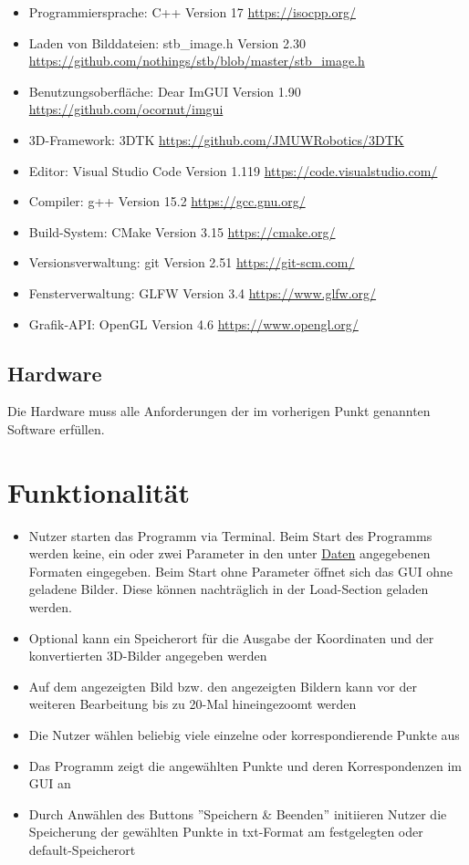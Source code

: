 \documentclass[a4paper,10pt]{scrartcl}
\begin{document}
\begin{itemize} 
\item Programmiersprache: C++ Version 17 \url{https://isocpp.org/} 
\item Laden von Bilddateien: stb\_image.h Version 2.30 \url{https://github.com/nothings/stb/blob/master/stb_image.h} 
\item Benutzungsoberfläche: Dear ImGUI Version 1.90 \url{https://github.com/ocornut/imgui} 
\item 3D-Framework: 3DTK \url{https://github.com/JMUWRobotics/3DTK} 
\item Editor: Visual Studio Code Version 1.119 \url{https://code.visualstudio.com/} 
\item Compiler: g++ Version 15.2 \url{https://gcc.gnu.org/} 
\item Build-System: CMake Version 3.15 \url{https://cmake.org/} 
\item Versionsverwaltung: git Version 2.51 \url{https://git-scm.com/} 
\item Fensterverwaltung: GLFW Version 3.4 \url{https://www.glfw.org/} 
\item Grafik-API: OpenGL Version 4.6 \url{https://www.opengl.org/} \end{itemize}

\subsection{Hardware}

Die Hardware muss alle Anforderungen der im vorherigen Punkt genannten Software erfüllen.

\section{Funktionalität}

\begin{itemize}
	\item Nutzer starten das Programm via Terminal. Beim Start des Programms werden keine, ein oder zwei Parameter in den unter \hyperref[daten]{Daten} angegebenen Formaten eingegeben. Beim Start ohne Parameter öffnet sich das GUI ohne geladene Bilder. Diese können nachträglich in der Load-Section geladen werden. 
	\item Optional kann ein Speicherort für die Ausgabe der Koordinaten und der konvertierten 3D-Bilder angegeben werden
	\item Auf dem angezeigten Bild bzw. den angezeigten Bildern kann vor der weiteren Bearbeitung bis zu 20-Mal hineingezoomt werden
	\item Die Nutzer wählen beliebig viele einzelne oder korrespondierende Punkte aus
	\item Das Programm zeigt die angewählten Punkte und deren Korrespondenzen im GUI an
	\item Durch Anwählen des Buttons ''Speichern \& Beenden'' initiieren Nutzer die Speicherung der gewählten Punkte in txt-Format am festgelegten oder default-Speicherort 
\end{itemize}
\end{document}
